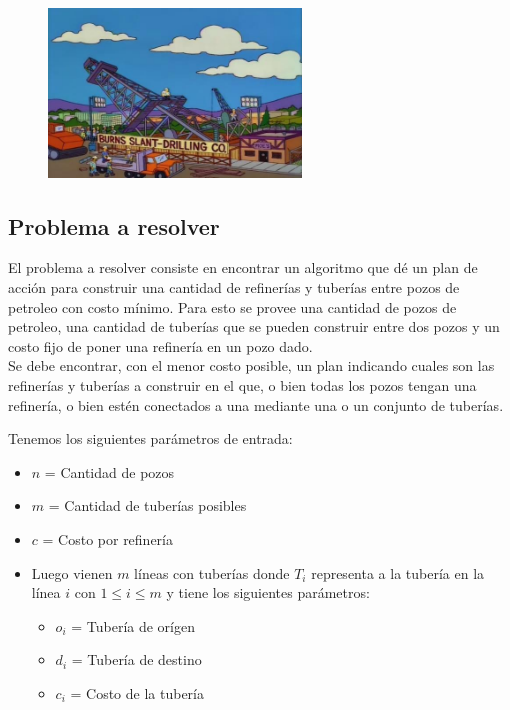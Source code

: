 \begin{figure}[h]
\begin{center}
\includegraphics[width=0.6\textwidth] {imagenes/burnsoil.JPG}
\end{center}
\end{figure}

\subsection{Problema a resolver}
El problema a resolver consiste en encontrar un algoritmo que dé un plan de acción para construir una cantidad de refinerías y tuberías entre pozos de petroleo con costo mínimo. Para esto se provee una cantidad de pozos de petroleo, una cantidad de tuberías que se pueden construir entre dos pozos y un costo fijo de poner una refinería en un pozo dado. \\
Se debe encontrar, con el menor costo posible, un plan indicando cuales son las refinerías y tuberías a construir en el que, o bien todas los pozos tengan una refinería, o bien estén conectados a una mediante una o un conjunto de tuberías.

\smallskip
Tenemos los siguientes parámetros de entrada:
	\begin{itemize}[noitemsep,nolistsep]
      \item $n$ = Cantidad de pozos
      \item $m$ = Cantidad de tuberías posibles
      \item $c$ = Costo por refinería
      \item Luego vienen $m$ líneas con tuberías donde $T_{i}$ representa a la tubería en la línea $i$ con $1 \leq i \leq m$ y tiene los siguientes parámetros:
      \begin{itemize}
      \item $o_{i}$ = Tubería de orígen
      \item $d_{i}$ = Tubería de destino
      \item $c_{i}$ = Costo de la tubería
      \end{itemize}
  	\end{itemize}
\smallskip


